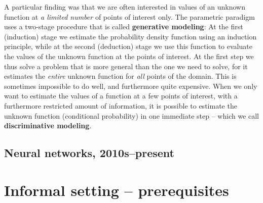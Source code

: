 \documentclass{article}
\begin{document}
A particular finding was that we are often interested in values of an unknown function at \textit{a limited number} of points of interest only. The parametric paradigm uses a two-stage procedure that is called \textbf{generative modeling}: At the first (induction) stage we estimate the probability density function using an induction principle, while at the second (deduction) stage we use this function to evaluate the values of the unknown function at the points of interest. At the first step we thus solve a problem that is more general than the one we need to solve, for it estimates the \textit{entire} unknown function for \textit{all} points of the domain. This is sometimes impossible to do well, and furthermore quite expensive. When we only want to estimate the values of a function at a few points of interest, with a furthermore restricted amount of information, it is possible to estimate the unknown function (conditional probability) in one immediate step -- which we call \textbf{discriminative modeling}.

\subsection{Neural networks, 2010s--present}


\newpage

\section{Informal setting -- prerequisites}
\end{document}
